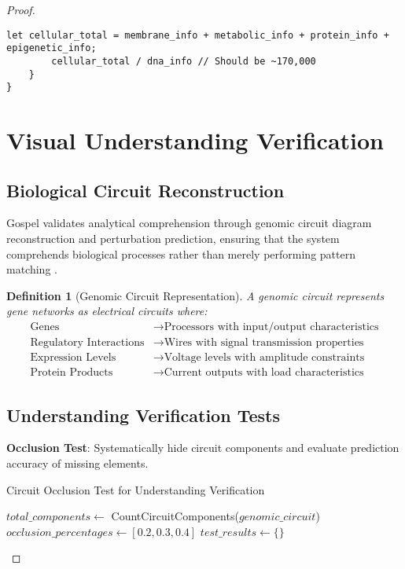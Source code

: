 \documentclass[12pt,a4paper]{article}
\newtheorem{definition}[theorem]{Definition}
\begin{document}
\begin{proof}
\begin{lstlisting}[style=ruststyle, caption=High-Performance Genomic Processing Core]
        let cellular_total = membrane_info + metabolic_info + protein_info + epigenetic_info;
        cellular_total / dna_info // Should be ~170,000
    }
}
\end{lstlisting}

\section{Visual Understanding Verification}

\subsection{Biological Circuit Reconstruction}

Gospel validates analytical comprehension through genomic circuit diagram reconstruction and perturbation prediction, ensuring that the system comprehends biological processes rather than merely performing pattern matching \cite{hopfield1982neural, bennett2003notes}.

\begin{definition}[Genomic Circuit Representation]
A genomic circuit represents gene networks as electrical circuits where:
\begin{align}
\text{Genes} &\rightarrow \text{Processors with input/output characteristics} \\
\text{Regulatory Interactions} &\rightarrow \text{Wires with signal transmission properties} \\
\text{Expression Levels} &\rightarrow \text{Voltage levels with amplitude constraints} \\
\text{Protein Products} &\rightarrow \text{Current outputs with load characteristics}
\end{align}
\end{definition}

\subsection{Understanding Verification Tests}

\textbf{Occlusion Test}: Systematically hide circuit components and evaluate prediction accuracy of missing elements.

\begin{algorithm}
\caption{Circuit Occlusion Test for Understanding Verification}
\begin{algorithmic}
    \State $total\_components \gets$ CountCircuitComponents($genomic\_circuit$)
    \State $occlusion\_percentages \gets [0.2, 0.3, 0.4]$
    \State $test\_results \gets \{\}$
    

\end{algorithmic}
\end{algorithm}
\end{proof}
\end{document}
